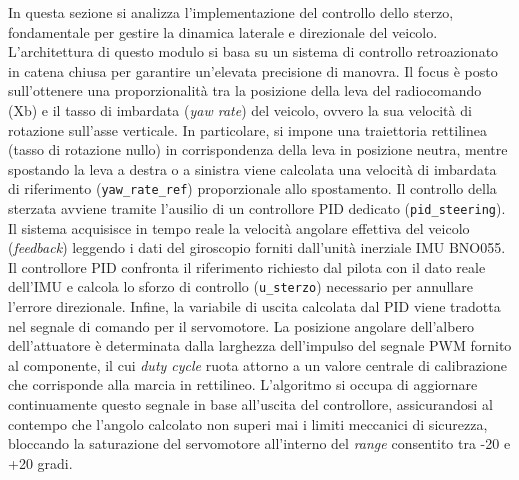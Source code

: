 \documentclass[11pt]{report}
\begin{document}
In questa sezione si analizza l'implementazione del controllo dello sterzo, fondamentale per gestire la dinamica laterale e direzionale del veicolo. L'architettura di questo modulo si basa su un sistema di controllo retroazionato in catena chiusa per garantire un'elevata precisione di manovra.
Il focus è posto sull'ottenere una proporzionalità tra la posizione della leva del radiocomando (Xb) e il tasso di imbardata (\textit{yaw rate}) del veicolo, ovvero la sua velocità di rotazione sull'asse verticale. In particolare, si impone una traiettoria rettilinea (tasso di rotazione nullo) in corrispondenza della leva in posizione neutra, mentre spostando la leva a destra o a sinistra viene calcolata una velocità di imbardata di riferimento (\verb|yaw_rate_ref|) proporzionale allo spostamento. 
Il controllo della sterzata avviene tramite l'ausilio di un controllore PID dedicato (\verb|pid_steering|). Il sistema acquisisce in tempo reale la velocità angolare effettiva del veicolo (\textit{feedback}) leggendo i dati del giroscopio forniti dall'unità inerziale IMU BNO055. Il controllore PID confronta il riferimento richiesto dal pilota con il dato reale dell'IMU e calcola lo sforzo di controllo (\verb|u_sterzo|) necessario per annullare l'errore direzionale. 
Infine, la variabile di uscita calcolata dal PID viene tradotta nel segnale di comando per il servomotore. La posizione angolare dell'albero dell'attuatore è determinata dalla larghezza dell'impulso del segnale PWM fornito al componente, il cui \textit{duty cycle} ruota attorno a un valore centrale di calibrazione che corrisponde alla marcia in rettilineo. L'algoritmo si occupa di aggiornare continuamente questo segnale in base all'uscita del controllore, assicurandosi al contempo che l'angolo calcolato non superi mai i limiti meccanici di sicurezza, bloccando la saturazione del servomotore all'interno del \textit{range} consentito tra -20 e +20 gradi.
\end{document}
